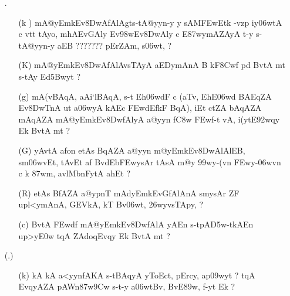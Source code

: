 \def\DevnagVersion{2.15}\documentclass{article}
\begin{document}
\begin{itemize}
\begin{itemize}
               \end{itemize}

\item[{\dn \dnnum \rn{13}}.] \begin{itemize}
            
            \item[({\dn k })] {\dn mA@yEmkEv\38DwAfAlAgts\2-tA@yyn-y y sAM\3FEwEtk\2 -vzp iy\306wtA c vt\?{\qvb}t\?{\rs ,\re} tAyo, mhAEvGAly\? Ev\398wEv\38DwAly\? c E\387wymAZAyA\2 t-y s\2-tA@yyn-y aEB {\rs ???????\re} pErZAm, s\2\306wt, {\rs ?\re} }

            \item[({\dn K})] {\dn mA@yEmkEv\38DwAfAlAvsTAyA aEDymAnA B kF\38Cwf\2 pd\2 BvtA\2 mt\? s\2-tAy Ed\35Bwy\?t {\rs ?\re}}
            
            \item[({\dn g})] {\dn mA(vBAqA{\rs ,\re} aAi`lBAqA{\rs ,\re} s\2-t Eh\306wdF c {\rs (\re}aTv{\rs ,\re} EhE\306wd BAEqZA\2 Ev\38DwT\0nA\2 ut\? a\306wyA kAEc \3FEwd\?EfkF BqA{\rs ),\re} iEt ctZA\2 bAqAZA\2 mAqAZA\2 mA@yEmkEv\38DwfAlyA a@yyn\2 f\3C8w\2 \3FEwf-t\2 vA{\rs ,\re} i(y\?tE\392wqy\? Ek\2 BvtA\2 mt {\rs ?\re}}
            
            \item[({\dn G})] {\dn yAvtA\2 a\2fon etAs\2 BqAZA a@yyn\2 m@yEmkEv\38DwAlAlEB, sm\306wv\?Et{\rs ,\re} tAvEt a\2f\? BvdEb\3FEwysAr\2 tAsA\2 m@y\? \399w\?y-(v\?n \3FEw\?y-\306wv\?n c k\2 \387wm, avlMbnFytA ah\0Et {\rs ?\re}} 
            
            \item[({\dn R})] {\dn etAs\2 BfAZA a@ypnT{\rdt} mAdyEmkEvGfAlAnA\2 smysAr ZF upl<ymAnA, GEVkA, kT\2 Bv\306wt, \326wyvsTApy\?, {\rs ?\re}}
            
            \item[({\dn c})] {\dn BvtA\2 \3FEwd\?f\? mA@yEmkEv\38DwfAlA yAEn s\2-tpA\3D5w-tkAEn up>y\3E0w\?{\rs ,\re} t\?qA\2 ZAdoqEvqy\? Ek\2 BvtA\2 mt {\rs ?\re}}
            \end{itemize}

\item[({\dn \dnnum \rn{14}}.)]\begin{itemize}
                
                \item[({\dn k})] {\dn kA kA a<yynfAKA s\2-tBAqyA yToEct, pErcy, ap\?\309wyt\? {\rs ?\re} t\?qA\2 EvqyAZA\2 pAWn\387w\39Cw\? s\2-t-y a\306wtB\0v, BvE\389w, f-yt\? Ek {\rs ?\re}}
                

\end{itemize}
\end{itemize}
\end{document}
